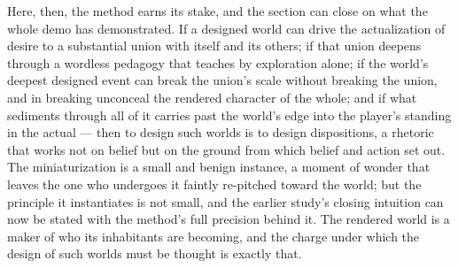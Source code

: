 Here, then, the method earns its stake, and the section can close on what the whole demo has demonstrated. If a designed world can drive the actualization of desire to a substantial union with itself and its others; if that union deepens through a wordless pedagogy that teaches by exploration alone; if the world's deepest designed event can break the union's scale without breaking the union, and in breaking unconceal the rendered character of the whole; and if what sediments through all of it carries past the world's edge into the player's standing in the actual — then to design such worlds is to design dispositions, a rhetoric that works not on belief but on the ground from which belief and action set out. The miniaturization is a small and benign instance, a moment of wonder that leaves the one who undergoes it faintly re-pitched toward the world; but the principle it instantiates is not small, and the earlier study's closing intuition can now be stated with the method's full precision behind it. The rendered world is a maker of who its inhabitants are becoming, and the charge under which the design of such worlds must be thought is exactly that.

